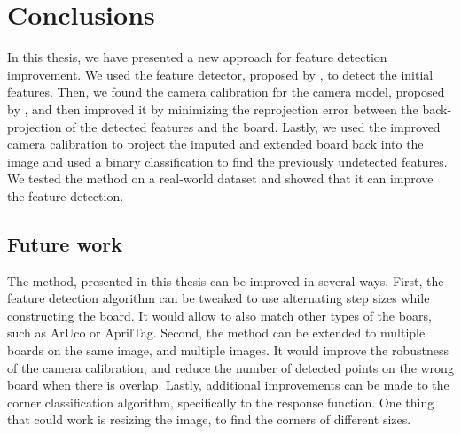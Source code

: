 \chapter{Conclusions}\label{cha:conclusions}

In this thesis, we have presented a new approach for feature detection
improvement. We used the feature detector, proposed by
\cite{geigerAutomaticCameraRange2012}, to detect the initial features. Then, we
found the camera calibration for the camera model, proposed by
\cite{scaramuzzaToolboxEasilyCalibrating2006}, and then improved it by
minimizing the reprojection error between the back-projection of the detected
features and the board. Lastly, we used the improved camera calibration to
project the imputed and extended board back into the image and used a binary
classification to find the previously undetected features. We tested the method
on a real-world dataset and showed that it can improve the feature detection.

\section{Future work}\label{sec:future_work}

The method, presented in this thesis can be improved in several ways. First, the
feature detection algorithm can be tweaked to use alternating step sizes while
constructing the board. It would allow to also match other types of the boars,
such as ArUco or AprilTag. Second, the method can be extended to multiple boards
on the same image, and multiple images. It would improve the robustness of the
camera calibration, and reduce the number of detected points on the wrong board
when there is overlap. Lastly, additional improvements can be made to the corner
classification algorithm, specifically to the response function. One thing that
could work is resizing the image, to find the corners of different sizes.

